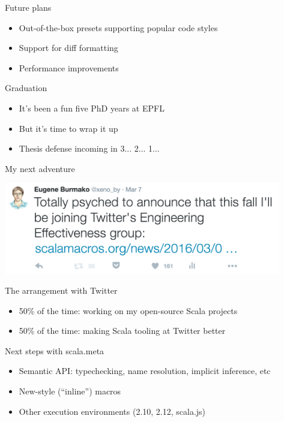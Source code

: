 \documentclass[svgnames,dvipsnames,hyperref={bookmarks=false},usepdftitle=false]{beamer}
\begin{document}
\begin{frame}{Future plans}
\begin{itemize}
\item Out-of-the-box presets supporting popular code styles
\item Support for diff formatting
\item Performance improvements
\end{itemize}
\end{frame}


\begin{frame}{Graduation}
\begin{itemize}
\item It's been a fun five PhD years at EPFL
\item But it's time to wrap it up
\item Thesis defense incoming in 3... 2... 1...
\end{itemize}
\end{frame}

\begin{frame}{My next adventure}
\vskip20pt
\begin{center}
\includegraphics[height=4cm]{twitter.png}
\end{center}
\end{frame}

\begin{frame}{The arrangement with Twitter}
\begin{itemize}
\item 50\% of the time: working on my open-source Scala projects
\item 50\% of the time: making Scala tooling at Twitter better
\end{itemize}
\end{frame}

\begin{frame}{Next steps with scala.meta}
\begin{itemize}
\item Semantic API: typechecking, name resolution, implicit inference, etc
\item New-style (``inline'') macros
\item Other execution environments (2.10, 2.12, scala.js)
\end{itemize}
\end{frame}
\end{document}
